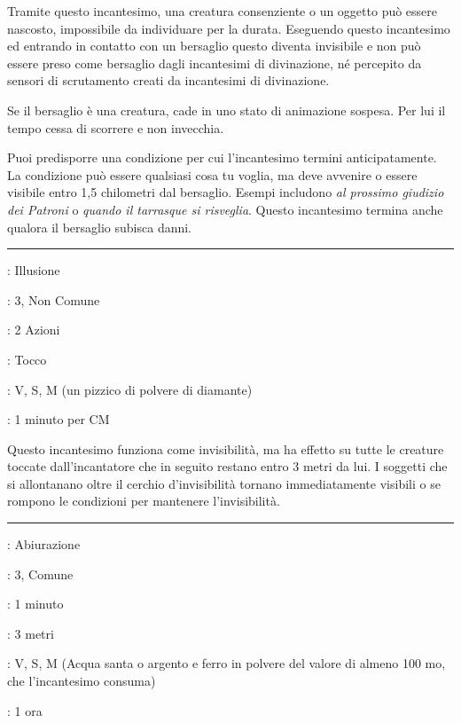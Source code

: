 \begin{multicols}{2}
Tramite questo incantesimo, una creatura consenziente o un oggetto può essere nascosto, impossibile da individuare per la durata. Eseguendo questo incantesimo ed entrando in contatto con un bersaglio questo diventa invisibile e non può essere preso come bersaglio dagli incantesimi di divinazione, né percepito da sensori di scrutamento creati da incantesimi di divinazione.

Se il bersaglio è una creatura, cade in uno stato di animazione sospesa. Per lui il tempo cessa di scorrere e non invecchia.

Puoi predisporre una condizione per cui l'incantesimo termini anticipatamente. La condizione può essere qualsiasi cosa tu voglia, ma deve avvenire o essere visibile entro 1,5 chilometri dal bersaglio. Esempi includono \emph{al prossimo giudizio dei Patroni} o \emph{quando il tarrasque si risveglia}. Questo incantesimo termina anche qualora il bersaglio subisca danni.

\smallskip\noindent\rule{\linewidth}{2pt} \hypertarget{Cerchio d'Invisibilità}{}\smallskip{}
\noindent
\begin{description}[noitemsep, topsep=0pt, parsep=0pt, partopsep=0pt, leftmargin=0cm, labelwidth=2.8cm]
	\item[\textbf{Lista di Magia}]: Illusione
	\item[\textbf{Livello}]: 3, Non Comune
	\item[\textbf{T. di Lancio}]: 2 Azioni
	\item[\textbf{Gittata}]: Tocco
	\item[\textbf{Componenti}]: V, S, M (un pizzico di polvere di diamante)
	\item[\textbf{Durata}]: 1 minuto per CM
\end{description}

Questo incantesimo funziona come invisibilità, ma ha effetto su tutte le creature toccate dall'incantatore che in seguito restano entro 3 metri da lui. I soggetti che si allontanano oltre il cerchio d'invisibilità tornano immediatamente visibili o se rompono le condizioni per mantenere l'invisibilità.


\smallskip\noindent\rule{\linewidth}{2pt} \hypertarget{Cerchio Magico}{}\smallskip{}
\noindent
\begin{description}[noitemsep, topsep=0pt, parsep=0pt, partopsep=0pt, leftmargin=0cm, labelwidth=2.8cm]
	\item[\textbf{Lista di Magia}]: Abiurazione
	\item[\textbf{Livello}]: 3, Comune
	\item[\textbf{T. di Lancio}]: 1 minuto
	\item[\textbf{Gittata}]: 3 metri
	\item[\textbf{Componenti}]: V, S, M (Acqua santa o argento e ferro in polvere del valore di almeno 100 mo, che l'incantesimo consuma)
	\item[\textbf{Durata}]: 1 ora
\end{description}


\end{multicols}
